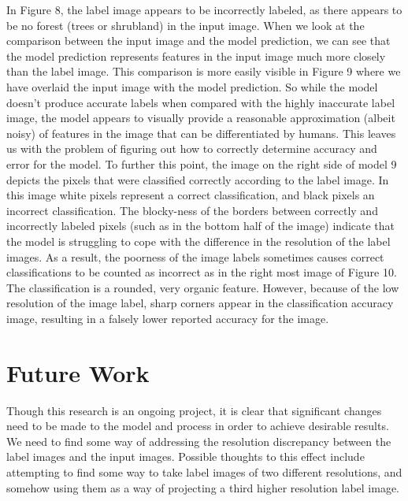 \documentclass[12pt]{article}
\begin{document}
 In Figure 8, the label image appears to be incorrectly labeled, as there appears to be no forest (trees or shrubland) in the input image. When we look at the comparison between the input image and the model prediction, we can see that the model prediction represents features in the input image much more closely than the label image. This comparison is more easily visible in Figure 9 where we have overlaid the input image with the model prediction. So while the model doesn't produce accurate labels when compared with the highly inaccurate label image, the model appears to visually provide a reasonable approximation (albeit noisy) of features in the image that can be differentiated by humans. This leaves us with the problem of figuring out how to correctly determine accuracy and error for the model. To further this point, the image on the right side of model 9 depicts the pixels that were classified correctly according to the label image. In this image white pixels represent a correct classification, and black pixels an incorrect classification. The blocky-ness of the borders between correctly and incorrectly labeled pixels (such as in the bottom half of the image) indicate that the model is struggling to cope with the difference in the resolution of the label images. As a result, the poorness of the image labels sometimes causes correct classifications to be counted as incorrect as in the right most image of Figure 10. The classification is a rounded, very organic feature. However, because of the low resolution of the image label, sharp corners appear in the classification accuracy image, resulting in a falsely lower reported accuracy for the image.

\begin{figure}[!htb]
\end{figure}


\section{Future Work}

Though this research is an ongoing project, it is clear that significant changes need to be made to the model and process in order to achieve desirable results. We need to find some way of addressing the resolution discrepancy between the label images and the input images. Possible thoughts to this effect include attempting to find some way to take label images of two different resolutions, and somehow using them as a way of projecting a third higher resolution label image. 
\end{document}
